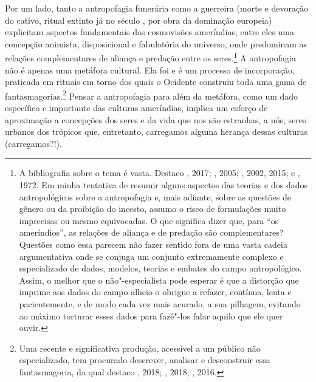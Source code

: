 Por um lado, tanto a antropofagia funerária como a guerreira (morte e
devoração do cativo, ritual extinto já no século , por obra da
dominação europeia) explicitam aspectos fundamentais das cosmovisões
ameríndias, entre eles uma concepção animista, disposicional e
fabulatória do universo, onde predominam as relações complementares de
aliança e predação entre os seres.\footnote{A bibliografia sobre o tema
  é vasta. Destaco , 2017; , 2005; ,
  2002, 2015; e , 1972. Em minha tentativa de resumir alguns
  aspectos das teorias e dos dados antropológicos sobre a antropofagia
  e, mais adiante, sobre as questões de gênero ou da proibição do
  incesto, assumo o risco de formulações muito imprecisas ou mesmo
  equivocadas. O que significa dizer que, para ``os ameríndios'', as
  relações de aliança e de predação são complementares? Questões como
  essa parecem não fazer sentido fora de uma vasta cadeia argumentativa
  onde se conjuga um conjunto extremamente complexo e especializado de
  dados, modelos, teorias e embates do campo antropológico. Assim, o
  melhor que o não"-especialista pode esperar é que a distorção que
  imprime aos dados do campo alheio o obrigue a refazer, contínua, lenta
  e pacientemente, e de modo cada vez mais acurado, a sua pilhagem,
  evitando ao máximo torturar esses dados para fazê"-los falar aquilo que
  ele quer ouvir.} A antropofagia não é apenas uma metáfora cultural.
Ela foi e é um processo de incorporação, praticada em rituais em torno
dos quais o Ocidente construiu toda uma gama de
fantasmagorias.\footnote{Uma recente e significativa produção, acessível
  a um público não especializado, tem procurado descrever, analisar e
  desconstruir essa fantasmagoria, da qual destaco , 2018;
  , 2018; , 2016.} Pensar a antropofagia para além da
metáfora, como um dado específico e importante das culturas ameríndias,
implica um esforço de aproximação a concepções dos seres e da vida que
nos são estranhas, a nós, seres urbanos dos trópicos que, entretanto,
carregamos alguma herança dessas culturas (carregamos?!).

